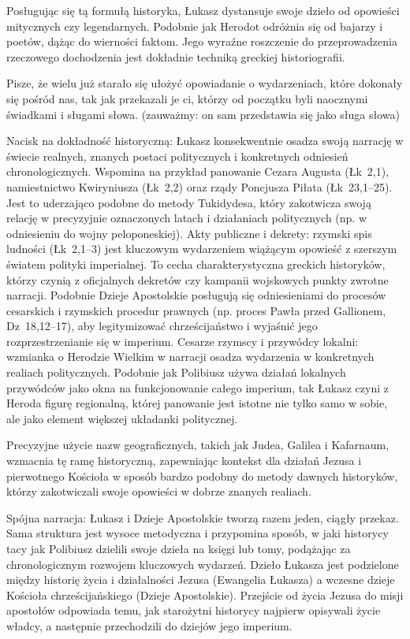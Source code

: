 Posługując się tą formułą historyka, Łukasz dystansuje swoje dzieło od opowieści mitycznych czy legendarnych.
Podobnie jak Herodot odróżnia się od bajarzy i poetów, dążąc do wierności faktom.
Jego wyraźne roszczenie do przeprowadzenia rzeczowego dochodzenia jest dokładnie techniką greckiej historiografii.

Pisze, że wielu już starało się ułożyć opowiadanie o wydarzeniach, które dokonały się pośród nas, tak jak przekazali je ci, którzy od początku byli naocznymi świadkami i sługami słowa.
(zauważmy: on sam przedstawia się jako sługa słowa)

Nacisk na dokładność historyczną: Łukasz konsekwentnie osadza swoją narrację w świecie realnych, znanych postaci politycznych i konkretnych odniesień chronologicznych.
Wspomina na przykład panowanie Cezara Augusta (Łk~2,1), namiestnictwo Kwiryniusza (Łk~2,2) oraz rządy Poncjusza Piłata (Łk~23,1–25).
Jest to uderzająco podobne do metody Tukidydesa, który zakotwicza swoją relację w precyzyjnie oznaczonych latach i działaniach politycznych (np. w odniesieniu do wojny peloponeskiej).
Akty publiczne i dekrety: rzymski spis ludności (Łk~2,1–3) jest kluczowym wydarzeniem wiążącym opowieść z szerszym światem polityki imperialnej.
To cecha charakterystyczna greckich historyków, którzy czynią z oficjalnych dekretów czy kampanii wojskowych punkty zwrotne narracji.
Podobnie Dzieje Apostolskie posługują się odniesieniami do procesów cesarskich i rzymskich procedur prawnych (np. proces Pawła przed Gallionem, Dz~18,12–17), aby legitymizować chrześcijaństwo i wyjaśnić jego rozprzestrzenianie się w imperium.
Cesarze rzymscy i przywódcy lokalni: wzmianka o Herodzie Wielkim w narracji osadza wydarzenia w konkretnych realiach politycznych.
Podobnie jak Polibiusz używa działań lokalnych przywódców jako okna na funkcjonowanie całego imperium, tak Łukasz czyni z Heroda figurę regionalną, której panowanie jest istotne nie tylko samo w sobie, ale jako element większej układanki politycznej.

Precyzyjne użycie nazw geograficznych, takich jak Judea, Galilea i Kafarnaum, wzmacnia tę ramę historyczną, zapewniając kontekst dla działań Jezusa i pierwotnego Kościoła w sposób bardzo podobny do metody dawnych historyków, którzy zakotwiczali swoje opowieści w dobrze znanych realiach.

Spójna narracja: Łukasz i Dzieje Apostolskie tworzą razem jeden, ciągły przekaz.
Sama struktura jest wysoce metodyczna i przypomina sposób, w jaki historycy tacy jak Polibiusz dzielili swoje dzieła na księgi lub tomy, podążając za chronologicznym rozwojem kluczowych wydarzeń.
Dzieło Łukasza jest podzielone między historię życia i działalności Jezusa (Ewangelia Łukasza) a wczesne dzieje Kościoła chrześcijańskiego (Dzieje Apostolskie).
Przejście od życia Jezusa do misji apostołów odpowiada temu, jak starożytni historycy najpierw opisywali życie władcy, a następnie przechodzili do dziejów jego imperium.

